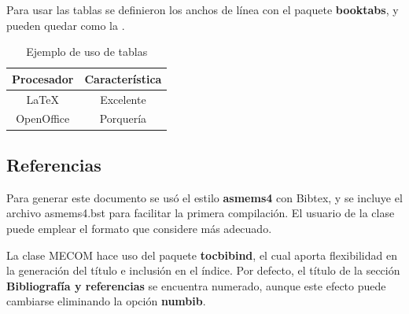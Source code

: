 \documentclass[a4paper,11pt,twoside]{MECOM}
\begin{document}
    
    \par
    Para usar las tablas se definieron los anchos de l\'inea con el paquete {\bf booktabs}, y pueden quedar como la .
    \begin{table}[ht]
        \centering
        \begin{tabular}{c c}
            \toprule
            \bf Procesador & \bf Caracter\'istica \\
            \midrule
            \LaTeX{} & Excelente \\
            OpenOffice & Porquer\'ia\\
            \bottomrule
        \end{tabular}
        \caption{Ejemplo de uso de tablas}
        \label{tab:prueba}
    \end{table}    
    


    
    \subsection{Referencias}
    Para generar este documento se us\'o el estilo {\bf asmems4} con Bibtex, y se incluye el archivo asmems4.bst para facilitar la primera compilaci\'on. El usuario de la clase puede emplear el formato que considere m\'as adecuado.
    \par
    La clase MECOM hace uso del paquete {\bf tocbibind}, el cual aporta flexibilidad en la generaci\'on del t\'itulo e inclusi\'on en el \'indice. Por defecto, el t\'itulo de la secci\'on {\bf Bibliograf\'ia y referencias} se encuentra numerado, aunque este efecto puede cambiarse eliminando la opci\'on {\bf numbib}.
    
    
    
    
\end{document}
